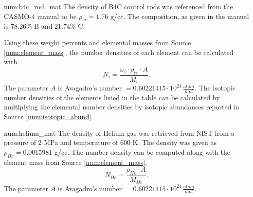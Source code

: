 \begin{numitem}{num:b4c_rod_mat}
   The density of B4C control rods was referenced from the CASMO-4 manual to be $\rho_{cr} = 1.76$ g/cc.  The composition, as given in the manual is 78.26\% B and 21.74\% C.

Using these weight percents and elemental masses from Source \ref{num:element_mass}, the number densities of each element can be calculated with.
\[
    N_i = \frac{\omega_i\cdot\rho_{cr}\cdot A}{M_i}.
\]
The parameter $A$ is Avagadro's number $=0.60221415\cdot 10^{24}\,\frac{atom}{mol}$. The isotopic number densities of the elements listed in the table can be calculated by multiplying the elemental number densities by isotopic abundances reported in Source \ref{num:isotopic_abund}.


\end{numitem}

\begin{numitem}{num:helium_mat}
   The density of Helium gas was retrieved from NIST from a pressure of 2 MPa and temperature of 600 K. The density was given as $\rho_{He} = 0.0015981$ g/cc. The number density can be computed along with the element mass from Source \ref{num:element_mass},
\[
    N_{He} = \frac{\rho_{He}\cdot A}{M_{He}}.
\]
The parameter $A$ is Avagadro's number $=0.60221415\cdot 10^{24}\,\frac{atom}{mol}$.


\end{numitem}

